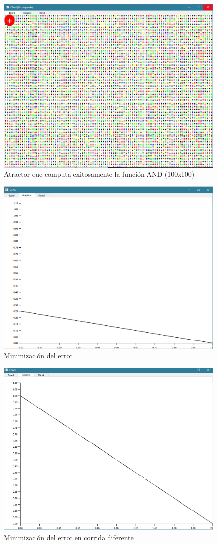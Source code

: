 \documentclass[]{article}
\begin{document}
\begin{figure}
	\centering
	\includegraphics[width=0.7\linewidth]{or_100_100}
	\caption{Atractor que computa exitosamente la función AND (100x100)}
	\label{fig:or_1010}
\end{figure}
\begin{figure}
\centering
\includegraphics[width=0.7\linewidth]{or_error}
\caption{Minimización del error}
\label{fig:or_error}
\end{figure}

\begin{figure}
\centering
\includegraphics[width=0.7\linewidth]{or_error_2}
\caption{Minimización del error en corrida diferente}
\label{fig:or_error_2}
\end{figure}
\end{document}
